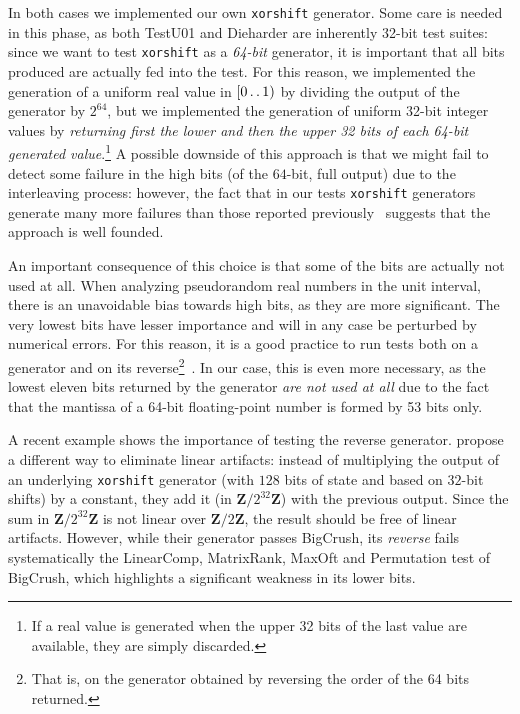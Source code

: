 \documentclass{acmsmalltr}
\def\..{\,\mathpunct{\ldotp\ldotp}}
\newcommand{\Z}{\mathbf Z}
\newcommand{\xorshift}[1][]{\texttt{xorshift#1}\xspace}
\begin{document}
In both cases we implemented our own \xorshift generator. Some care is needed in
this phase, as both TestU01 and Dieharder are inherently 32-bit test suites:
since we want to test \xorshift as a \emph{64-bit} generator, it is important
that all bits produced are actually fed into the test. For this reason, we
implemented the generation of a uniform real value in $[0\..1)$ by dividing the
output of the generator by $2^{64}$, but we implemented the generation of
uniform 32-bit integer values by \emph{returning first the lower and then the upper
32 bits of each 64-bit generated value}.\footnote{If a real value is generated
when the upper 32 bits of the last value are available, they are simply
discarded.} A possible downside of this approach is 
that we might fail to detect some failure in the high bits (of the $64$-bit,
full output) due to the interleaving process: however, the fact that in our
tests \xorshift generators generate many more failures than those reported previously~\cite{PaLXRNG}
suggests that the approach is well founded.

An important consequence of this choice is that some of the bits are actually
not used at all. When analyzing pseudorandom real numbers in the unit interval,
there is an unavoidable bias towards high bits, as they are more significant.
The very lowest bits have lesser importance and will in any case be perturbed by
numerical errors. For this reason, it is a good practice to run 
tests both on a generator and on its reverse\footnote{That is, on
the generator obtained by reversing the order of the 64 bits returned.}~\cite{PTVNR}.
In our case, this is even more necessary, as the lowest eleven bits returned by the generator \emph{are
not used at all} due to the fact that the mantissa of a 64-bit floating-point
number is formed by 53 bits only.  

A recent example shows the importance of testing the reverse generator. 
 propose a different way to eliminate linear artifacts: instead of multiplying the
output of an underlying \xorshift generator (with $128$ bits of state and based on $32$-bit shifts) by a
constant, they add it (in $\Z/2^{32}\Z$) with the previous output. Since the sum
in $\Z/2^{32}\Z$ is not linear over $\Z/2\Z$, the result should be
free of linear artifacts.
However, while their generator passes BigCrush, its \emph{reverse} fails
systematically the LinearComp, MatrixRank, MaxOft and Permutation test of
BigCrush, which highlights a significant weakness in its lower bits.
\end{document}
